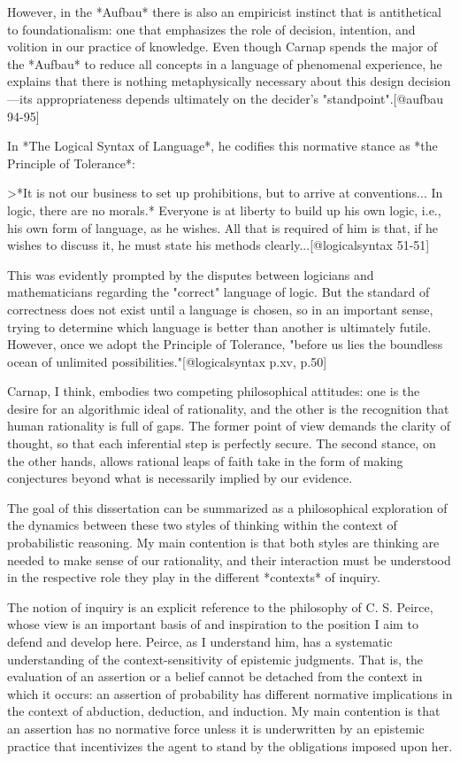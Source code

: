 However, in the *Aufbau* there is also an empiricist instinct that is
antithetical to foundationalism: one that emphasizes the role of
decision, intention, and volition in our practice of knowledge. Even
though Carnap spends the major of the *Aufbau* to reduce all concepts in
a language of phenomenal experience, he explains that there is nothing
metaphysically necessary about this design decision---its
appropriateness depends ultimately on the decider's
"standpoint".{[}@aufbau 94-95{]}

In *The Logical Syntax of Language*, he codifies this normative stance
as *the Principle of Tolerance*:

\textgreater{}*It is not our business to set up prohibitions, but to
arrive at conventions... In logic, there are no morals.* Everyone is at
liberty to build up his own logic, i.e., his own form of language, as he
wishes. All that is required of him is that, if he wishes to discuss it,
he must state his methods clearly...{[}@logicalsyntax 51-51{]}

This was evidently prompted by the disputes between logicians and
mathematicians regarding the "correct" language of logic. But the
standard of correctness does not exist until a language is chosen, so in
an important sense, trying to determine which language is better than
another is ultimately futile. However, once we adopt the Principle of
Tolerance, "before us lies the boundless ocean of unlimited
possibilities."{[}@logicalsyntax p.xv, p.50{]}

Carnap, I think, embodies two competing philosophical attitudes: one is
the desire for an algorithmic ideal of rationality, and the other is the
recognition that human rationality is full of gaps. The former point of
view demands the clarity of thought, so that each inferential step is
perfectly secure. The second stance, on the other hands, allows rational
leaps of faith take in the form of making conjectures beyond what is
necessarily implied by our evidence.

The goal of this dissertation can be summarized as a philosophical
exploration of the dynamics between these two styles of thinking within
the context of probabilistic reasoning. My main contention is that both
styles are thinking are needed to make sense of our rationality, and
their interaction must be understood in the respective role they play in
the different *contexts* of inquiry.

The notion of inquiry is an explicit reference to the philosophy of C.
S. Peirce, whose view is an important basis of and inspiration to the
position I aim to defend and develop here. Peirce, as I understand him,
has a systematic understanding of the context-sensitivity of epistemic
judgments. That is, the evaluation of an assertion or a belief cannot be
detached from the context in which it occurs: an assertion of
probability has different normative implications in the context of
abduction, deduction, and induction. My main contention is that an
assertion has no normative force unless it is underwritten by an
epistemic practice that incentivizes the agent to stand by the
obligations imposed upon her.

